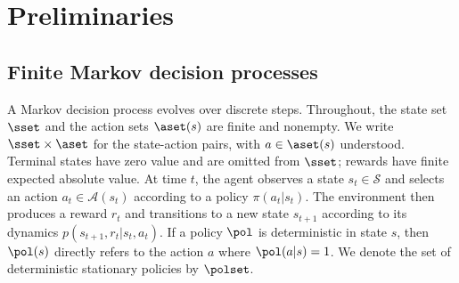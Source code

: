 \section{Preliminaries}
\label{sec: mcopi}


\subsection{Finite Markov decision processes}


A Markov decision process evolves over discrete steps.
Throughout, the state set $\sset$ and the action sets $\aset(s)$ are finite and nonempty. We write $\sset\times\aset$ for the state-action pairs, with $a\in\aset(s)$ understood. Terminal states have zero value and are omitted from $\sset$; rewards have finite expected absolute value.
At time \(t\), the agent observes a state \(s_t \in \mathcal S\) and selects an action \(a_t \in \mathcal A(s_t)\) according to a policy \(\pi(a_t | s_t)\).
The environment then produces a reward \(r_t\) and transitions to a new state \(s_{t+1}\) according to its dynamics $p(s_{t+1}, r_t | s_t, a_t)$.
If a policy $\pol$ is deterministic in state $s$, then $\pol(s)$ directly refers to the action $a$ where $\pol(a | s) = 1$.
We denote the set of deterministic stationary policies by $\polset$.

